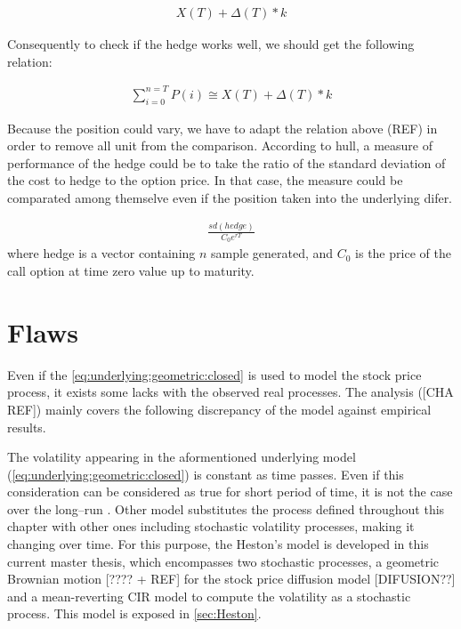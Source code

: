 \documentclass[12pt]{report}
\begin{document}
\begin{align}
  X(T) + \Delta(T) * k
\end{align}

Consequently to check if the hedge works well, we should get the following relation:

\begin{align}
 \sum_{i = 0}^{n = T} P(i) \cong X(T) + \Delta(T) * k
\end{align}

Because the position could vary, we have to adapt the relation above (REF) in order to remove all unit from the comparison.
According to hull, a measure of performance of the hedge could be to take the ratio of the standard deviation of the cost to hedge to the option price. In that case, the measure could be comparated among themselve even if the position taken into the underlying difer.

\begin{align}
  \frac{sd(hedge)}{C_0 e ^{r T}}
  \label{bsm:delta:hedge:perf}
\end{align}
where hedge is a vector containing $n$ sample generated, and $C_0$ is the price of the call option at time zero value up to maturity.























\section{Flaws}
\label{sec:Flaws}

Even if the \cref{eq:underlying:geometric:closed} is used to model the stock price process, it exists some lacks with the observed real processes. The analysis ([CHA REF]) mainly covers the following discrepancy of the model against empirical results.
  
The volatility appearing in the aformentioned underlying model (\ref{eq:underlying:geometric:closed}) is constant as time passes.
Even if this consideration can be considered as true for short period of time, it is not the case over the long--run \citet{teneng2011limitations}.
Other model substitutes the process defined throughout this chapter with other ones including stochastic volatility processes, making it changing over time.
For this purpose, the Heston's model is developed in this current master thesis, which encompasses two stochastic processes, a geometric Brownian motion [???? + REF] for the stock price diffusion model [DIFUSION??] and a mean-reverting CIR model to compute the volatility as a stochastic process.
This model is exposed in \cref{sec:Heston}.
\end{document}
